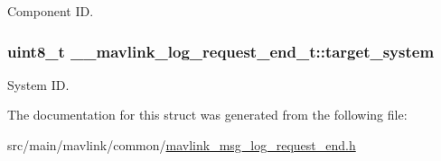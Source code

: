 Component I\+D. 

\hypertarget{struct____mavlink__log__request__end__t_a90cbedc0127fd1b3316d1a66c6ec24fb}{
\subsubsection[{target\+\_\+system}]{\setlength{\rightskip}{0pt plus 5cm}uint8\+\_\+t \+\_\+\+\_\+mavlink\+\_\+log\+\_\+request\+\_\+end\+\_\+t\+::target\+\_\+system}}\label{struct____mavlink__log__request__end__t_a90cbedc0127fd1b3316d1a66c6ec24fb}


System I\+D. 



The documentation for this struct was generated from the following file\+:\begin{DoxyCompactItemize}
\item 
src/main/mavlink/common/\hyperlink{mavlink__msg__log__request__end_8h}{mavlink\+\_\+msg\+\_\+log\+\_\+request\+\_\+end.\+h}\end{DoxyCompactItemize}
